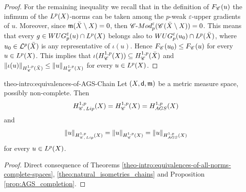 \documentclass[12pt]{amsart}
\newcommand{\sfd}{{\sf d}}
\newcommand{\X}{{\rm X}}
\newcommand{\Lip}{{\rm Lip}}
\newcommand{\mm}{\mathfrak m}
\newcommand{\F}{{\rm F}}
\theoremstyle{definition}
\newcommand{\cModepsilon}[2]{{\mathscr C}\text{-}{\rm Mod}_{#2}^{#1}}
\newcommand{\Chain}[1]{\mathscr{C}^{#1}}
\newcommand{\WUG}[2]{{\rm WUG}_{#1}^{#2}}
\newcommand{\HH}[2]{H^{1,#1}_{{\rm #2}}}
\renewcommand{\F}[1]{{\rm F}_{{\rm #1}}}
\begin{document}
\begin{proof}
    For the remaining inequality we recall that in the definition of $\F{\Chain{}}(u)$ the infimum of the $L^p(\X)$-norms can be taken among the $p$-weak $\varepsilon$-upper gradients of $u$. Moreover, since $\mm(\bar{\X}\setminus \X) = 0$, then $\cModepsilon{\varepsilon}{p}(\Chain{}(\bar{\X}\setminus \X)) = 0$. This means that every $g\in \WUG{p}{\varepsilon}(u) \cap L^p(\X)$ belongs also to $\WUG{p}{\varepsilon}(u_0) \cap L^p(\bar{\X})$, where $u_0\in \mathcal{L}^p(\bar{\X})$ is any representative of $\iota(u)$. Hence $\F{\Chain{}}(u_0) \le \F{\Chain{}}(u)$ for every $u\in L^p(\X)$. This implies that $\iota(\HH{p}{\Chain{}}(\X)) \subseteq \HH{p}{\Chain{}}(\bar{\X})$ and $\|\iota(u) \|_{\HH{p}{\Chain{}}(\bar{\X})} \le \|u\|_{\HH{p}{\Chain{}}(\X)}$ for every $u \in L^p(\X)$.
\end{proof}

\begin{reptheorem}{theo-intro:equivalences-of-AGS-Chain}
    Let $(\X,\sfd,\mm)$ be a metric measure space, possibly non-complete. Then
    \begin{equation}
        \HH{p}{\Chain{},\, \Lip}(\X) = \HH{p}{\Chain{}}(\X) = \HH{p}{AGS}(\X)
    \end{equation}
    and
    \begin{equation}
        \|u \|_{\HH{p}{\Chain{},\, \Lip}(\X)}  = \|u \|_{\HH{p}{\Chain{}}(\X)} = \|u \|_{\HH{p}{AGS}(\X)}
    \end{equation}
    for every $u\in L^p(\X)$.
\end{reptheorem}
\begin{proof}
    Direct consequence of Theorems \ref{theo-intro:equivalences-of-all-norms-complete-spaces}, \ref{theo:natural_isometries_chains} and Proposition \ref{prop:AGS_completion}.
\end{proof}
%
%
%
\end{document}
